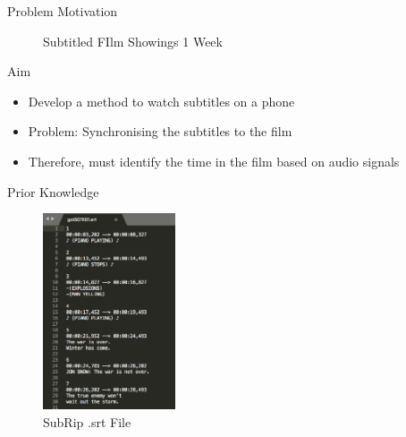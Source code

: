 \documentclass[notes]{beamer}
\begin{document}
\begin{frame}{Problem Motivation}
\begin{figure}
\begin{minipage}{0.45\textwidth}
		\caption{Subtitled FIlm Showings 1 Week}
	\end{minipage}
\end{figure}
\end{frame}



\begin{frame}{Aim}
\begin{itemize}
	\item Develop a method to watch subtitles on a phone
	\item Problem: Synchronising the subtitles to the film
	\item Therefore, must identify the time in the film based on audio signals
\end{itemize}
\end{frame}


\begin{frame}{Prior Knowledge}
\begin{figure}
	\centering
	\includegraphics[width=0.35\textwidth]{figures/srt}
	\caption{SubRip .srt File}
\end{figure}
\end{frame}

\end{document}
